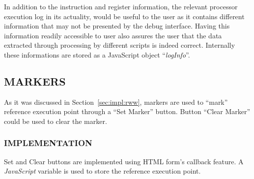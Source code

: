 In addition to the instruction and register information, the relevant processor execution log in its actuality, would be useful to the user as it contains different information that may not be presented by the debug interface. Having this information readily accessible to user also assures the user that the data extracted through processing by different scripts is indeed correct. Internally these informations are stored as a JavaScript object ``{\it logInfo}''.


\subsection{MARKERS}
As it was discussed in Section~\ref{sec:impl:rww}, markers are used to ``mark'' reference execution point through a ``Set Marker'' button. Button ``Clear Marker'' could  be used to clear the marker.

\subsubsection{IMPLEMENTATION}

Set and Clear buttons are implemented using HTML form's callback feature. A {\it JavaScript} variable is used to store the reference execution point.


